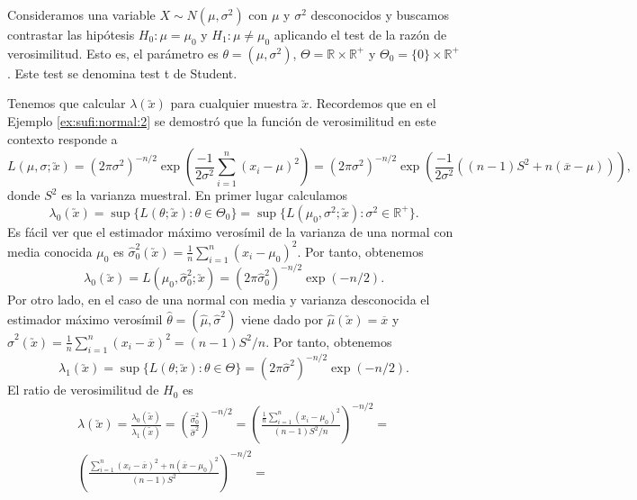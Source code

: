         \begin{ex}
            Consideramos una variable $X \sim N(\mu, \sigma^2)$ con $\mu$ y $\sigma^2$ desconocidos y buscamos contrastar las hipótesis $H_0: \mu = \mu_0$ y $H_1: \mu \ne \mu_0$ aplicando el test de la razón de verosimilitud. Esto es, el parámetro es $\theta = (\mu, \sigma^2)$, $\Theta = \mathbb{R}\times\mathbb{R}^+$ y $\Theta_0 = \{0\}\times\mathbb{R}^+$. Este test se denomina test t de Student.

            Tenemos que calcular $\lambda(\utilde{x})$ para cualquier muestra $\utilde{x}$. Recordemos que en el Ejemplo \ref{ex:sufi:normal:2} se demostró que la función de verosimilitud en este contexto responde a
            \[L(\mu, \sigma; \utilde{x}) = (2 \pi \sigma^2)^{-n/2} \exp\left(\frac{-1}{2 \sigma^2} \sum_{i = 1}^n (x_i - \mu)^2\right) = (2 \pi \sigma^2)^{-n/2} \exp\left(\frac{-1}{2 \sigma^2} ((n-1)S^2 + n(\overline{x}-\mu))\right),\]
            donde $S^2$ es la varianza muestral. En primer lugar calculamos
            \[\lambda_0(\utilde{x}) = \sup\{L(\theta;\utilde{x}): \theta \in \Theta_0\} = \sup\{L(\mu_0, \sigma^2;\utilde{x}): \sigma^2 \in \mathbb{R}^+\}.\]
            Es fácil ver que el estimador máximo verosímil de la varianza de una normal con media conocida $\mu_0$ es $\hat{\sigma}_0^2(\utilde{x}) = \frac{1}{n}\sum_{i = 1}^n (x_i - \mu_0)^2$. Por tanto, obtenemos
            \[\lambda_0(\utilde{x}) = L(\mu_0, \hat{\sigma}_0^2; \utilde{x}) = (2 \pi \hat{\sigma}_0^2)^{-n/2} \exp(-n / 2).\]
            Por otro lado, en el caso de una normal con media y varianza desconocida el estimador máximo verosímil $\hat{\theta} = (\hat{\mu}, \hat{\sigma}^2)$ viene dado por $\hat{\mu}(\utilde{x}) = \overline{x}$ y $\hat{\sigma}^2(\utilde{x}) = \frac{1}{n}\sum_{i = 1}^n (x_i - \overline{x})^2 = (n-1)S^2/n$. Por tanto, obtenemos
            \[\lambda_1(\utilde{x}) = \sup\{L(\theta;\utilde{x}): \theta \in \Theta\} = (2 \pi \hat{\sigma}^2)^{-n/2} \exp(-n / 2).\]
            El ratio de verosimilitud de $H_0$ es
            \begin{equation} \label{eq:lrt:normal}
            \begin{split}
            \lambda(\utilde{x}) = \frac{\lambda_0(\utilde{x})}{\lambda_1(\utilde{x})} = \left(\frac{\hat{\sigma}_0^2}{\hat{\sigma}^2}\right)^{-n/2} = \left(\frac{\frac{1}{n}\sum_{i = 1}^n (x_i - \mu_0)^2}{(n-1)S^2/n}\right)^{-n/2} = \\ \left(\frac{\sum_{i = 1}^n (x_i - \overline{x})^2 + n(\overline{x} - \mu_0)^2}{(n-1)S^2}\right)^{-n/2} =

\end{split}
\end{equation}
\end{ex}
